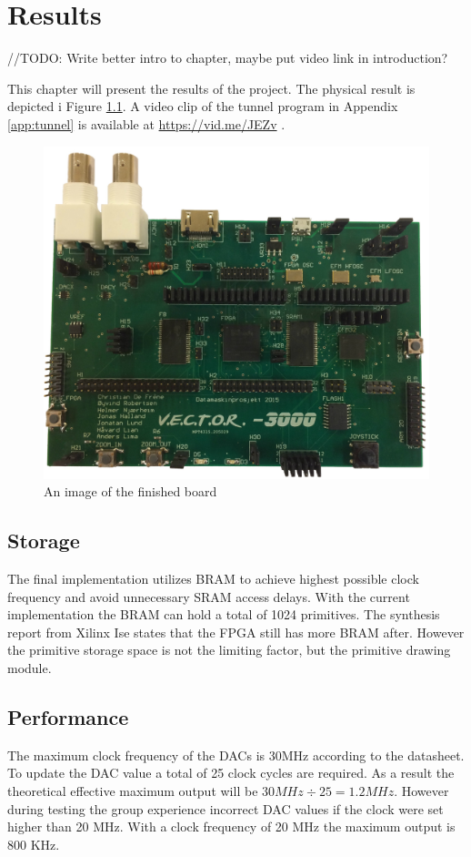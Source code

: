 \chapter{Results}
//TODO: Write better intro to chapter, maybe put video link in introduction?

This chapter will present the results of the project. The physical result is depicted i Figure \ref{fig:board-top}.
A video clip of the tunnel program in Appendix \ref{app:tunnel} is available at \href{https://vid.me/JEZv}{https://vid.me/JEZv} \cite{tunnel-demo}.

\begin{figure}[h!]
	    \includegraphics[width=\linewidth]{images/board_top.jpg}
	    \caption{An image of the finished \vthreek board}
	    \label{fig:board-top}
\end{figure}

\section{Storage}
The final implementation utilizes BRAM to achieve highest possible clock frequency and avoid unnecessary SRAM access delays.
With the current implementation the BRAM can hold a total of 1024 primitives.
The synthesis report from Xilinx Ise states that the FPGA still has more BRAM after.
However the primitive storage space is not the limiting factor, but the primitive drawing module.

\section{Performance}
The maximum clock frequency of the DACs is 30MHz according to the datasheet.
To update the DAC value a total of 25 clock cycles are required.
As a result the theoretical effective maximum output will be \(30 MHz \div 25 = 1.2 MHz \).
However during testing the group experience incorrect DAC values if the clock were set higher than 20 MHz.
With a clock frequency of 20 MHz the maximum output is 800 KHz.

